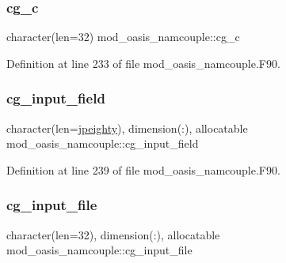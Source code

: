 \subsubsection{\texorpdfstring{cg\+\_\+c}{cg\_c}}
{\footnotesize\ttfamily character(len=32) mod\+\_\+oasis\+\_\+namcouple\+::cg\+\_\+c\hspace{0.3cm}{\ttfamily [private]}}



Definition at line 233 of file mod\+\_\+oasis\+\_\+namcouple.\+F90.

\mbox{\label{namespacemod__oasis__namcouple_aad4d4857b4c424e1b0f0bcc0a01aa6e3}} 
\subsubsection{\texorpdfstring{cg\+\_\+input\+\_\+field}{cg\_input\_field}}
{\footnotesize\ttfamily character(len=\hyperlink{namespacemod__oasis__namcouple_a4fb10ad6e864dcbe34c4a8b02204a523}{jpeighty}), dimension(\+:), allocatable mod\+\_\+oasis\+\_\+namcouple\+::cg\+\_\+input\+\_\+field\hspace{0.3cm}{\ttfamily [private]}}



Definition at line 239 of file mod\+\_\+oasis\+\_\+namcouple.\+F90.

\mbox{\label{namespacemod__oasis__namcouple_a24f56cf88d79190f229d3fd1d62d17de}} 
\subsubsection{\texorpdfstring{cg\+\_\+input\+\_\+file}{cg\_input\_file}}
{\footnotesize\ttfamily character(len=32), dimension(\+:), allocatable mod\+\_\+oasis\+\_\+namcouple\+::cg\+\_\+input\+\_\+file\hspace{0.3cm}{\ttfamily [private]}}



